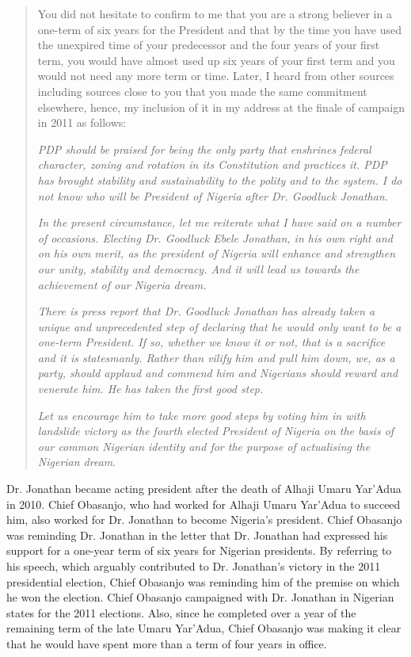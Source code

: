 \documentclass[output=paper,colorlinks,citecolor=brown]{langscibook}
\begin{document}
\begin{quote}
You did not hesitate to confirm to me that you are a strong believer in a one-term of six years for the President and that by the time you have used the unexpired time of your predecessor and the four years of your first term, you would have almost used up six years of your first term and you would not need any more term or time. Later, I heard from other sources including sources close to you that you made the same commitment elsewhere, hence, my inclusion of it in my address at the finale of campaign in 2011 as follows: 
    
\textit{PDP should be praised for being the only party that enshrines federal character, zoning and rotation in its Constitution and practices it. PDP has brought stability and sustainability to the polity and to the system. I do not know who will be President of Nigeria after Dr. Goodluck Jonathan.}

\textit{In the present circumstance, let me reiterate what I have said on a number of occasions. Electing Dr. Goodluck Ebele Jonathan, in his own right and on his own merit, as the president of Nigeria will enhance and strengthen our unity, stability and democracy. And it will lead us towards the achievement of our Nigeria dream. }

\textit{There is press report that Dr. Goodluck Jonathan has already taken a unique and unprecedented step of declaring that he would only want to be a one-term President. If so, whether we know it or not, that is a sacrifice and it is statesmanly. Rather than vilify him and pull him down, we, as a party, should applaud and commend him and Nigerians should reward and venerate him. He has taken the first good step.}

\textit{Let us encourage him to take more good steps by voting him in with landslide victory as the fourth elected President of Nigeria on the basis of our common Nigerian identity and for the purpose of actualising the Nigerian dream}. 
\end{quote}

Dr. Jonathan became acting president after the death of Alhaji Umaru Yar’Adua in 2010. Chief Obasanjo, who had worked for Alhaji Umaru Yar’Adua to succeed him, also worked for Dr. Jonathan to become Nigeria's president. Chief Obasanjo was reminding Dr. Jonathan in the letter that Dr. Jonathan had expressed his support for a one-year term of six years for Nigerian presidents. By referring to his speech, which arguably contributed to Dr. Jonathan’s victory in the 2011 presidential election, Chief Obasanjo was reminding him of the premise on which he won the election. Chief Obasanjo campaigned with Dr. Jonathan in Nigerian states for the 2011 elections. Also, since he completed over a year of the remaining term of the late Umaru Yar’Adua, Chief Obasanjo was making it clear that he would have spent more than a term of four years in office.
\end{document}
